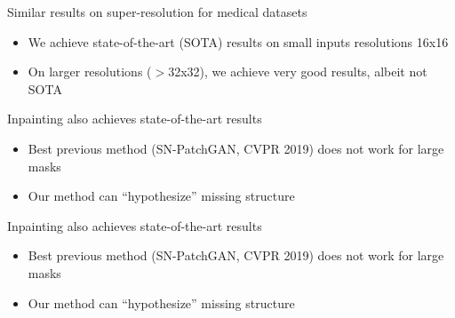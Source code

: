 \begin{frame}{Similar results on super-resolution for medical datasets}

\begin{itemize}
 \item We achieve state-of-the-art (SOTA) results on small inputs resolutions 16x16
 \item On larger resolutions ($>$32x32), we achieve very good results, albeit not SOTA
\end{itemize}

\begin{center}
{}
\end{center}
 
\end{frame}

\begin{frame}{Inpainting also achieves state-of-the-art results}

\begin{itemize}
 \item Best previous method (SN-PatchGAN, CVPR 2019) does not work for large masks
 \item Our method can ``hypothesize'' missing structure
\end{itemize}

\begin{center}
{}
\end{center}
 
\end{frame}

\begin{frame}{Inpainting also achieves state-of-the-art results}

\begin{itemize}
 \item Best previous method (SN-PatchGAN, CVPR 2019) does not work for large masks
 \item Our method can ``hypothesize'' missing structure
\end{itemize}

\begin{center}
{}
\end{center}
 
\end{frame}


